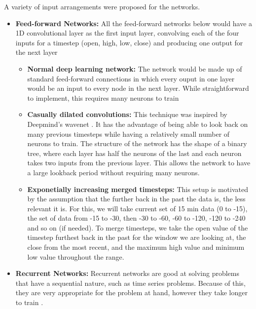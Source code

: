         A variety of input arrangements were proposed for the networks.

        \begin{itemize}

            \item \textbf{Feed-forward Networks:} All the feed-forward networks below would have a 1D convolutional layer as the first input layer, convolving each of the four inputs for a timestep (open, high, low, close) and producing one output for the next layer

            \begin{itemize}
                    
                \item \textbf{Normal deep learning network:} The network would be made up of standard feed-forward connections in which every ouput in one layer would be an input to every node in the next layer. While straightforward to implement, this requires many neurons to train 

                \item \textbf{Casually dilated convolutions:} This technique was inspired by Deepmind's wavenet \cite{wavenet}. It has the advantage of being able to look back on many previous timesteps while having a relatively small number of neurons to train. The structure of the network has the shape of a binary tree, where each layer has half the neurons of the last and each neuron takes two inputs from the previous layer. This allows the network to have a large lookback period without requiring many neurons.
            
                \item \textbf{Exponetially increasing merged timesteps:} This setup is motivated by the assumption that the further back in the past the data is, the less relevant it is. For this, we will take current set of 15 min data (0 to -15), the set of data from -15 to -30, then -30 to -60, -60 to -120, -120 to -240 and so on (if needed). To merge timesteps, we take the open value of the timestep furthest back in the past for the window we are looking at, the close from the most recent, and the maximum high value and minimum low value throughout the range. 
            
            \end{itemize}

            \item \textbf{Recurrent Networks:} Recurrent networks are good at solving problems that have a sequential nature, such as time series problems. Because of this, they are very appropriate for the problem at hand, however they take longer to train \cite{wavenet}.
            

\end{itemize}
